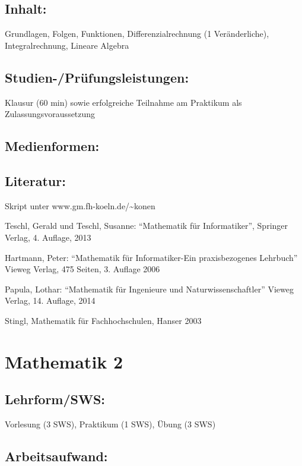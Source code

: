 \section{Inhalt:}\label{inhalt-13}

Grundlagen, Folgen, Funktionen, Differenzialrechnung (1 Veränderliche),
Integralrechnung, Lineare Algebra

\section{Studien-/Prüfungsleistungen:}\label{studien-pruxfcfungsleistungen-13}

Klausur (60 min) sowie erfolgreiche Teilnahme am Praktikum als
Zulassungsvoraussetzung

\section{Medienformen:}\label{medienformen-13}

\section{Literatur:}\label{literatur-13}

Skript unter www.gm.fh-koeln.de/\textasciitilde{}konen

Teschl, Gerald und Teschl, Susanne: ``Mathematik für Informatiker'',
Springer Verlag, 4. Auflage, 2013

Hartmann, Peter: ``Mathematik für Informatiker-Ein praxisbezogenes
Lehrbuch'' Vieweg Verlag, 475 Seiten, 3. Auflage 2006

Papula, Lothar: ``Mathematik für Ingenieure und Naturwissenschaftler''
Vieweg Verlag, 14. Auflage, 2014

Stingl, Mathematik für Fachhochschulen, Hanser 2003

\chapter{Mathematik 2}\label{mathematik-2}

\section{Lehrform/SWS:}\label{lehrformsws-14}

Vorlesung (3 SWS), Praktikum (1 SWS), Übung (3 SWS)

\section{Arbeitsaufwand:}\label{arbeitsaufwand-14}

